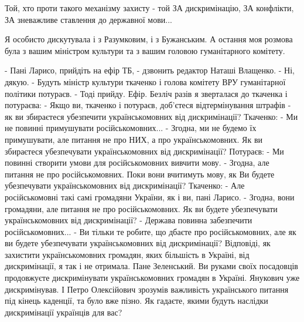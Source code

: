 Той, хто проти такого механізму захисту - той ЗА дискримінацію, ЗА конфлікти,
ЗА зневажливе ставлення до державної мови...  

Я особисто дискутувала і з Разумковим, і з Бужанським. А остання моя розмова
була з вашим міністром культури та з вашим головою гуманітарного комітету.  

- Пані Ларисо, прийдіть на ефір ТБ, - дзвонить редактор Наташі Влащенко.
- Ні, дякую.
- Будуть міністр культури ткаченко і голова комітету ВРУ гуманітарної політики потураєв.
- Тоді прийду.
Ефір. Безліч разів я  зверталася до ткаченка і потураєва:
- Якщо ви, ткаченко і потураєв, доб'єтеся відтермінування штрафів - як ви збираєтеся убезпечити українськомовних від дискримінації?
Ткаченко:
- Ми не повинні примушувати російськомовних...
- Згодна, ми не будемо їх примушувати, але питання не про НИХ, а про українськомовних. Як ви збираєтеся убезпечувати українськомовних від дискримінації?
Потураєв:
- Ми повинні створити умови для російськомовних вивчити мову.
- Згодна, але питання не про російськомовних. Поки вони вчитимуть мову, як Ви будете убезпечувати українськомовних від дискримінації?
Ткаченко:
- Але російськомовні такі самі громадяни України, як і ви, пані Ларисо.
- Згодна, вони громадяни, але питання не про російськомовних. Як ви будете убезпечувати українськомовних від дискримінації?
- Держава повинна забезпечити російськомовних...
- Ви тільки те  робите, що дбаєте про російськомовних, але як ви будете убезпечувати українськомовних від дискримінації?
Відповіді, як захистити українськомовних громадян, яких більшість в Україні, від дискримінації, я так і не отримала.
Пане Зеленський. Ви руками своїх посадовців продовжуєте дискримінувати українськомовних громадян в Україні. Янукович уже дискримінував. І Петро Олексійович зрозумів важливість українського питання під кінець каденції, та було вже пізно. Як гадаєте, якими будуть наслідки дискримінації українців для вас?
